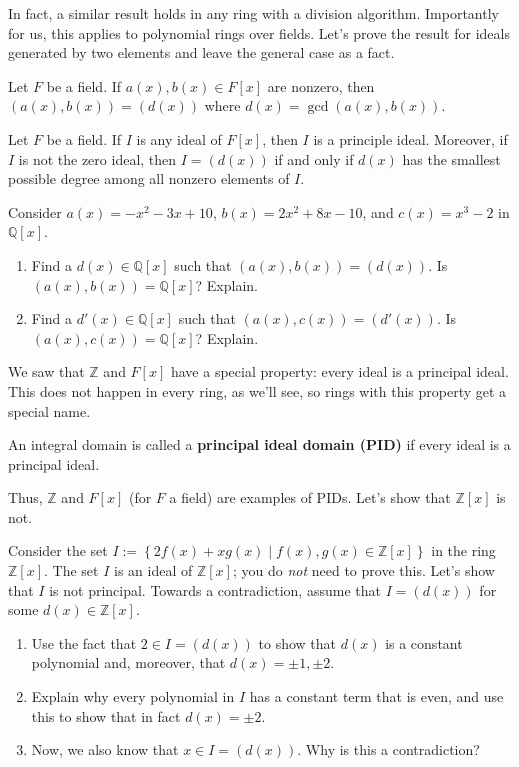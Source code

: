 In fact, a similar result holds in any ring with a division algorithm. Importantly for us, this applies to polynomial rings over fields. Let's prove the result for ideals generated by two elements and leave the general case as a fact.

\begin{theorem}\label{thm.TwoGeneratedIsPrincipalFx}
Let $F$ be a field. If $a(x),b(x)\in F[x]$ are nonzero, then $(a(x),b(x)) = (d(x))$ where $d(x) = \gcd(a(x),b(x))$.
\end{theorem}

\begin{fact}\label{fact.FxPID}
Let $F$ be a field. If $I$ is any ideal of $F[x]$, then $I$ is a principle ideal. Moreover, if $I$ is not the zero ideal, then $I = (d(x))$ if and only if $d(x)$ has the smallest possible degree among all nonzero elements of $I$.
\end{fact}

\begin{problem}\label{prob.ShowIdealIsPrincipalQx}
Consider $a(x) = -x^2 -3x + 10$, $b(x) = 2x^2 + 8x - 10$, and $c(x) = x^3 - 2$ in $\mathbb{Q}[x]$.
\begin{enumerate}
\item Find a $d(x) \in \mathbb{Q}[x]$ such that $(a(x),b(x)) = (d(x))$. Is $(a(x),b(x)) = \mathbb{Q}[x]$? Explain.
\item Find a $d'(x) \in \mathbb{Q}[x]$ such that $(a(x),c(x)) = (d'(x))$. Is $(a(x),c(x)) = \mathbb{Q}[x]$? Explain.
\end{enumerate}
\end{problem}

We saw that $\mathbb{Z}$ and $F[x]$ have a special property: every ideal is a principal ideal. This does not happen in every ring, as we'll see, so rings with this property get a special name.

\begin{definition}
An integral domain is called a \textbf{principal ideal domain (PID)} if every ideal is a principal ideal.
\end{definition}

Thus, $\mathbb{Z}$ and $F[x]$ (for $F$ a field) are examples of PIDs. Let's show that $\mathbb{Z}[x]$ is not.

\begin{problem}
Consider the set $I:= \left\{2f(x) + xg(x)\mid f(x),g(x) \in \mathbb{Z}[x]\right\}$ in the ring $\mathbb{Z}[x]$. The set $I$ is an ideal of $\mathbb{Z}[x]$; you do \emph{not} need to prove this. Let's show that $I$ is not principal. Towards a contradiction, assume that $I = (d(x))$ for some $d(x)\in \mathbb{Z}[x]$.
\begin{enumerate}
\item Use the fact that $2\in I = (d(x))$ to show that $d(x)$ is a constant polynomial and, moreover, that $d(x) = \pm 1,\pm2$. 
\item Explain why every polynomial in $I$ has a constant term that is even, and use this to show that in fact $d(x) = \pm2$.
\item Now, we also know that $x\in I = (d(x))$. Why is this a contradiction?
\end{enumerate}
\end{problem}

